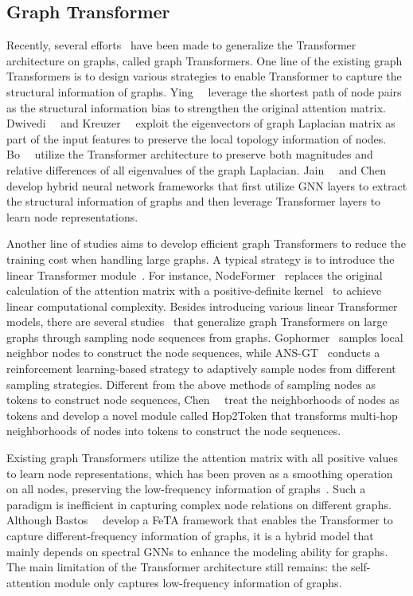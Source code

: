 \documentclass[sigconf, screen]{acmart}
\begin{document}
\subsection{Graph Transformer}
Recently, several efforts~\cite{graphormer,sat,nodeformer,nagphormer} have been made to generalize the Transformer architecture on graphs, called graph Transformers.
One line of the existing graph Transformers is to design various strategies to enable Transformer to capture the structural information of graphs.
Ying~\etal~\cite{graphormer} leverage the shortest path of node pairs as the structural information bias to strengthen the original attention matrix.
Dwivedi~\etal~\cite{gt} and Kreuzer~\etal~\cite{san} exploit the eigenvectors of graph Laplacian matrix as part of the input features to preserve the local topology information of nodes.
Bo~\etal~\cite{specformer} utilize the Transformer architecture to preserve both magnitudes and relative differences of all eigenvalues of the graph Laplacian.
Jain~\etal~\cite{graphtrans} and Chen~\etal~\cite{sat} develop hybrid neural network frameworks that first utilize GNN layers to extract the structural information of graphs and then leverage Transformer layers to learn node representations.

Another line of studies aims to develop efficient graph Transformers to reduce the training cost when handling large graphs.
A typical strategy is to introduce the linear Transformer module~\cite{gps,nodeformer}.
For instance, NodeFormer~\cite{nodeformer} replaces the original calculation of the attention matrix with a positive-definite kernel~\cite{performer} to achieve linear computational complexity.
Besides introducing various linear Transformer models, 
there are several studies~\cite{gophormer,ansgt,nagphormer} that generalize graph Transformers on large graphs through sampling node sequences from graphs.
Gophormer~\cite{gophormer} samples local neighbor nodes to construct the node sequences, while ANS-GT~\cite{ansgt} conducts a reinforcement learning-based strategy to adaptively sample nodes from different sampling strategies. 
Different from the above methods of sampling nodes as tokens to construct node sequences,
Chen~\etal~\cite{nagphormer} treat the neighborhoods of nodes as tokens and develop a novel module called Hop2Token that transforms multi-hop neighborhoods of nodes into tokens to construct the node sequences.

Existing graph Transformers utilize the attention matrix with all positive values to learn node representations, which has been proven as a smoothing operation on all nodes, preserving the low-frequency information of graphs~\cite{feta}.
Such a paradigm is inefficient in capturing complex node relations on different graphs.
Although Bastos~\etal~\cite{feta} develop a FeTA framework that enables the Transformer to capture different-frequency information of graphs, it is a hybrid model that mainly depends on spectral GNNs to enhance the modeling ability for graphs.
The main limitation of the Transformer architecture still remains: the self-attention module only captures low-frequency information of graphs. 
\end{document}
